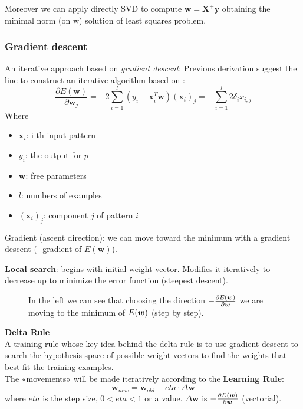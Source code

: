 \documentclass[../main.tex]{subfiles}
\begin{document}
Moreover we can apply directly SVD to compute $ \mathbf{w =X^+y} $ obtaining the minimal norm (on w) solution of least squares problem.
\subsubsection{Gradient descent}
An iterative approach based on  \emph{gradient descent}:
Previous derivation suggest the line to construct an iterative algorithm based on :
$$\frac{\partial E(\mathbf{w})}{\partial\mathbf{w}_j} = -2\sum_{i = 1}^{l} (y_i - \mathbf{x}_i^T\mathbf{w})(\mathbf{x}_i)_j
= 
-\sum_{i=1}^{l} 2\delta_i x_{i, j}
$$
Where
\begin{itemize}
    \item $\mathbf{x}_i$: i-th input pattern
    \item $y_i$: the output for $p$
    \item $\mathbf{w}$: free parameters
    \item $l$: numbers of examples
    \item $(\mathbf{x}_i)_j$: component $j$ of pattern $i$
\end{itemize}
Gradient (ascent direction): we can move toward the minimum with a gradient descent (- gradient of $E(\mathbf{w})$).

\textbf{Local search}: begins with initial weight vector. Modifies it iteratively to decrease up to minimize the error function (steepest descent).
\begin{figure}[H]
  \centering
  \hfill
  \caption{\scriptsize In the left we can see that choosing the direction $-\frac{\partial E(\boldsymbol{w}) }{\partial \boldsymbol{w}} $ we are moving to the minimum of $E(\boldsymbol{w})$ (step by step).}
\end{figure}

\noindent\textbf{Delta Rule}\\
A training rule whose key idea behind the delta rule is to use gradient descent to search the hypothesis space of possible weight vectors to find the weights that best fit the training examples.\\
The «movements» will be made iteratively according to the \textbf{Learning Rule}:
$$\mathbf{w}_{new} = \mathbf{w}_{old} + eta \cdot \Delta \mathbf{w}$$
where $eta$ is the step size, $0<eta<1$ or a value. $\Delta \mathbf{w}$ is $-\frac{\partial E(\boldsymbol{w}) }{\partial \boldsymbol{w}}$ (vectorial).
\end{document}
